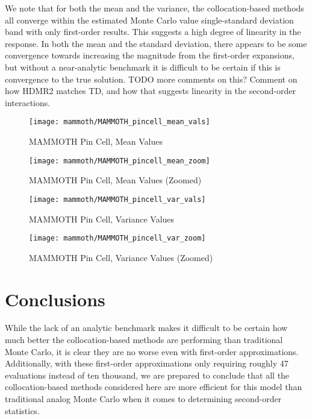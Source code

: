 We note that for both the mean and the variance, the collocation-based methods all converge within the
estimated Monte Carlo value single-standard deviation band with only first-order results.  This suggests a
high degree of linearity in the response.  In both the mean and the standard deviation, there appears to be
some convergence towards increasing the magnitude from the first-order expansions, but without a near-analytic
benchmark it is difficult to be certain if this is convergence to the true solution.  TODO more comments on
this?  Comment on how HDMR2 matches TD, and how that suggests linearity in the second-order interactions.
\begin{figure}[htb]
  \centering
  \texttt{[image: mammoth/MAMMOTH\_pincell\_mean\_vals]}
  \caption{MAMMOTH Pin Cell, Mean Values}
  \label{fig:mammoth mean}
\end{figure}
\begin{figure}[htb]
  \centering
  \texttt{[image: mammoth/MAMMOTH\_pincell\_mean\_zoom]}
  \caption{MAMMOTH Pin Cell, Mean Values (Zoomed)}
  \label{fig:mammoth mean zoom}
\end{figure}
\begin{figure}[htb]
  \centering
  \texttt{[image: mammoth/MAMMOTH\_pincell\_var\_vals]}
  \caption{MAMMOTH Pin Cell, Variance Values}
  \label{fig:mammoth var}
\end{figure}
\begin{figure}[htb]
  \centering
  \texttt{[image: mammoth/MAMMOTH\_pincell\_var\_zoom]}
  \caption{MAMMOTH Pin Cell, Variance Values (Zoomed)}
  \label{fig:mammoth var zoom}
\end{figure}

\section{Conclusions}
While the lack of an analytic benchmark makes it difficult to be certain how much better the collocation-based
methods are performing than traditional Monte Carlo, it is clear they are no worse even with first-order
approximations.  Additionally, with these first-order approximations only requiring roughly 47 evaluations
instead of ten thousand, we are prepared to conclude that all the collocation-based methods considered here
are more efficient for this model than traditional analog Monte Carlo when it comes to determining
second-order statistics.

%
%
